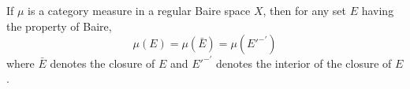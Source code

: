 If $\mu$ is a category measure in a regular Baire space $X$, then for any set $E$ having the property of Baire,
$$\mu(E) = \mu(\bar{E}) = \mu(E'^{-'})$$
where $\bar{E}$ denotes the closure of $E$ and $E'^{-'}$ denotes the interior of the closure of $E$.
